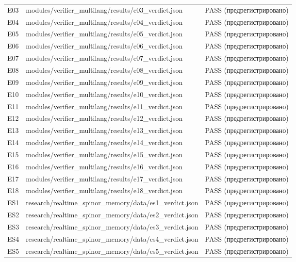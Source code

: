 \documentclass[11pt,a4paper]{article}
\begin{document}
\begin{table}[htbp]
\begin{tabular}{p{} p{} p{}}
E03 & modules/verifier\_multilang/results/e03\_verdict.json & PASS (предрегистрировано) \\
E04 & modules/verifier\_multilang/results/e04\_verdict.json & PASS (предрегистрировано) \\
E05 & modules/verifier\_multilang/results/e05\_verdict.json & PASS (предрегистрировано) \\
E06 & modules/verifier\_multilang/results/e06\_verdict.json & PASS (предрегистрировано) \\
E07 & modules/verifier\_multilang/results/e07\_verdict.json & PASS (предрегистрировано) \\
E08 & modules/verifier\_multilang/results/e08\_verdict.json & PASS (предрегистрировано) \\
E09 & modules/verifier\_multilang/results/e09\_verdict.json & PASS (предрегистрировано) \\
E10 & modules/verifier\_multilang/results/e10\_verdict.json & PASS (предрегистрировано) \\
E11 & modules/verifier\_multilang/results/e11\_verdict.json & PASS (предрегистрировано) \\
E12 & modules/verifier\_multilang/results/e12\_verdict.json & PASS (предрегистрировано) \\
E13 & modules/verifier\_multilang/results/e13\_verdict.json & PASS (предрегистрировано) \\
E14 & modules/verifier\_multilang/results/e14\_verdict.json & PASS (предрегистрировано) \\
E15 & modules/verifier\_multilang/results/e15\_verdict.json & PASS (предрегистрировано) \\
E16 & modules/verifier\_multilang/results/e16\_verdict.json & PASS (предрегистрировано) \\
E17 & modules/verifier\_multilang/results/e17\_verdict.json & PASS (предрегистрировано) \\
E18 & modules/verifier\_multilang/results/e18\_verdict.json & PASS (предрегистрировано) \\
ES1 & research/realtime\_spinor\_memory/data/es1\_verdict.json & PASS (предрегистрировано) \\
ES2 & research/realtime\_spinor\_memory/data/es2\_verdict.json & PASS (предрегистрировано) \\
ES3 & research/realtime\_spinor\_memory/data/es3\_verdict.json & PASS (предрегистрировано) \\
ES4 & research/realtime\_spinor\_memory/data/es4\_verdict.json & PASS (предрегистрировано) \\
ES5 & research/realtime\_spinor\_memory/data/es5\_verdict.json & PASS (предрегистрировано) \\
\bottomrule
\end{tabular}
\end{table}
\end{document}
